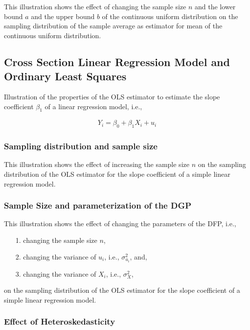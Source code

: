 \documentclass{article}
\begin{document}
This illustration shows the effect of changing the sample size $n$ and the lower bound $a$ and the upper bound $b$ of the continuous uniform distribution on the sampling distribution of the sample average as estimator for mean of the continuous uniform distribution.

\subsection{Cross Section Linear Regression Model and Ordinary Least Squares}

Illustration of the properties of the OLS estimator to estimate the slope coefficient $\beta_{1}$ of a linear regression model, i.e.,

\begin{align}
	Y_{i} = \beta_{0} + \beta_{1} X_{i} + u_{i}
\end{align}

\subsubsection{Sampling distribution and sample size}


This illustration shows the effect of increasing the sample size $n$ on the sampling distribution of the OLS estimator for the slope coefficient of a simple linear regression model.

\subsubsection{Sample Size and parameterization of the DGP}


This illustration shows the effect of changing the parameters of the DFP, i.e.,  

\begin{itemize}
	\item[1.] changing the sample size $n$,
	\item[2.] changing the variance of $u_{i}$, i.e., $\sigma_{u_{i}}^{2}$, and,
	\item[3.] changing the variance of $X_{i}$, i.e., $\sigma_{X}^{2}$, 
\end{itemize}

on the sampling distribution of the OLS estimator for the slope coefficient of a simple linear regression model.

\subsubsection{Effect of Heteroskedasticity}
\end{document}
